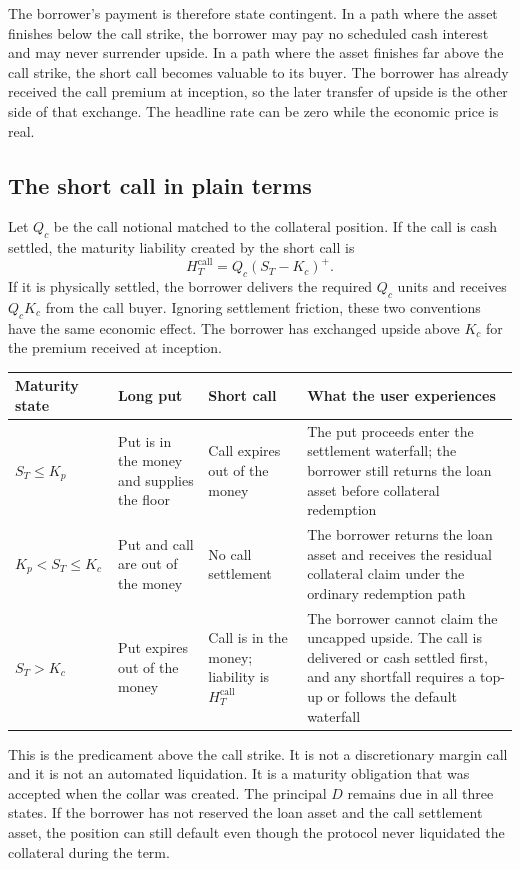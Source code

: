 \documentclass[11pt,oneside]{article}
\begin{document}
The borrower's payment is therefore state contingent. In a path where the asset
finishes below the call strike, the borrower may pay no scheduled cash interest
and may never surrender upside. In a path where the asset finishes far above
the call strike, the short call becomes valuable to its buyer. The borrower has
already received the call premium at inception, so the later transfer of
upside is the other side of that exchange. The headline rate can be zero while
the economic price is real.

\subsection{The short call in plain terms}

Let $Q_c$ be the call notional matched to the collateral position. If the call
is cash settled, the maturity liability created by the short call is
\[
H_T^{\mathrm{call}}=Q_c(S_T-K_c)^+.
\]
If it is physically settled, the borrower delivers the required $Q_c$ units
and receives $Q_cK_c$ from the call buyer. Ignoring settlement friction, these
two conventions have the same economic effect. The borrower has exchanged
upside above $K_c$ for the premium received at inception.

\begin{center}
\begin{tabularx}{\textwidth}{@{}p{}YYY@{}}
\toprule
\textbf{Maturity state} & \textbf{Long put} & \textbf{Short call} & \textbf{What the user experiences} \\
\midrule
$S_T\leq K_p$ & Put is in the money and supplies the floor & Call expires out of the money & The put proceeds enter the settlement waterfall; the borrower still returns the loan asset before collateral redemption \\
$K_p<S_T\leq K_c$ & Put and call are out of the money & No call settlement & The borrower returns the loan asset and receives the residual collateral claim under the ordinary redemption path \\
$S_T>K_c$ & Put expires out of the money & Call is in the money; liability is $H_T^{\mathrm{call}}$ & The borrower cannot claim the uncapped upside. The call is delivered or cash settled first, and any shortfall requires a top-up or follows the default waterfall \\
\bottomrule
\end{tabularx}
\end{center}

This is the predicament above the call strike. It is not a discretionary margin
call and it is not an automated liquidation. It is a maturity obligation that
was accepted when the collar was created. The principal $D$ remains due in all
three states. If the borrower has not reserved the loan asset and the call
settlement asset, the position can still default even though the protocol never
liquidated the collateral during the term.
\end{document}
